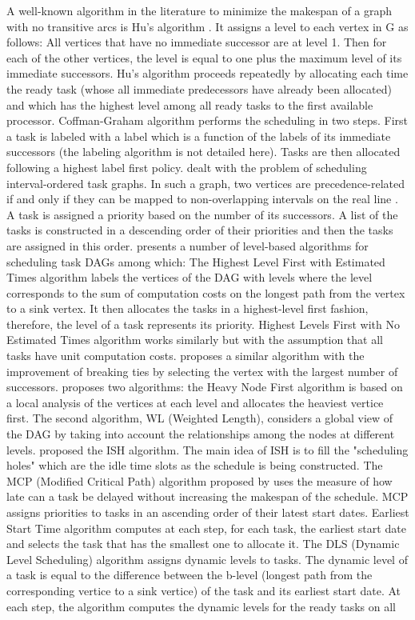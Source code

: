 A well-known algorithm in the literature to minimize the makespan of a graph with no transitive arcs is Hu's algorithm \cite{hu:1961}. It assigns a level to each vertex in G as follows: All vertices that have no immediate successor are at level 1. Then for each of the other vertices, the level is equal to one plus the maximum level of its immediate successors. Hu's algorithm proceeds repeatedly by allocating each time the ready task (whose all immediate predecessors have already been allocated) and which has the highest level among all ready tasks to the first available processor. Coffman-Graham algorithm \cite{coffman:1972} performs the scheduling in two steps. First a task is labeled with a label which is a function of the labels of its immediate successors (the labeling algorithm is not detailed here). Tasks are then allocated following a highest label first policy. \cite{papadimitriou:1979} dealt with the problem of scheduling interval-ordered task graphs. In such a graph, two vertices are precedence-related if and only if they can be mapped to non-overlapping intervals on the real line \cite{fishburn:1985}. A task is assigned a priority based on the number of its successors. A list of the tasks is constructed in a descending order of their priorities and then the tasks are assigned in this order. \cite{adam:1974} presents a number of level-based algorithms for scheduling task DAGs among which: The Highest Level First with Estimated Times algorithm labels the vertices of the DAG with levels where the level corresponds to the sum of computation costs on the longest path from the vertex to a sink vertex. It then allocates the tasks in a highest-level first fashion, therefore, the level of a task represents its priority. Highest Levels First with No Estimated Times algorithm works similarly but with the assumption that all tasks have unit computation costs. \cite{kasahara:1984} proposes a similar algorithm with the improvement of breaking ties by selecting the vertex with the largest number of successors. \cite{shirazi:1990} proposes two algorithms: the Heavy Node First algorithm is based on a local analysis of the vertices at each level and allocates the heaviest vertice first. The second algorithm, WL (Weighted Length), considers a global view of the DAG by taking into account the relationships among the nodes at different levels. \cite{kruatrachue:1987} proposed the ISH algorithm. The main idea of ISH is to fill the "scheduling holes"  which are the idle time slots as the schedule is being constructed. The MCP (Modified Critical Path) algorithm proposed by \cite{wu:1990} uses the measure of how late can a task be delayed without increasing the makespan of the schedule. MCP assigns priorities to tasks in an ascending order of their latest start dates. \cite{hwang:1989} Earliest Start Time algorithm computes at each step, for each task, the earliest start date and selects the task that has the smallest one to allocate it. The DLS (Dynamic Level Scheduling) algorithm \cite{sih:1993} assigns dynamic levels to tasks. The dynamic level of a task is equal to the difference between the b-level (longest path from the corresponding vertice to a sink vertice) of the task and its earliest start date. At each step, the algorithm computes the dynamic levels for the ready tasks on all 